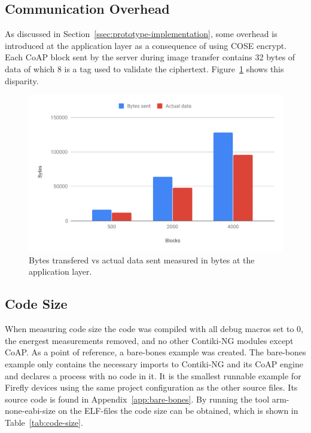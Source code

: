 \documentclass[0-thesis.tex]{subfiles}
\begin{document}
\newpage
\subsection{Communication Overhead}
\label{ssec:communication-overhead}
As discussed in Section~\ref{ssec:prototype-implementation}, some overhead is introduced
at the application layer as a consequence of using COSE encrypt. Each CoAP block sent by
the server during image transfer contains 32 bytes of data of which 8 is a tag used to
validate the ciphertext. Figure~\ref{fig:communication-overhead} shows this disparity.

\begin{figure}[h!]
    \caption{Bytes transfered vs actual data sent measured in bytes at the application layer.}
    \label{fig:communication-overhead}
    \includegraphics[scale=0.65]{images/communication-overhead.pdf}
\end{figure}

\subsection{Code Size}
\label{ssec:code-size}
When measuring code size the code was compiled with all debug macros set to 0, the
energest measurements removed, and no other Contiki-NG modules except CoAP. As a point of
reference, a bare-bones example was created. The bare-bones example only contains the
necessary imports to Contiki-NG and its CoAP engine and declares a process with no code in
it. It is the smallest runnable example for Firefly devices using the same project
configuration as the other source files. Its source code is found in
Appendix~\ref{app:bare-bones}. By running the tool arm-none-eabi-size on the ELF-files the
code size can be obtained, which is shown in Table~\ref{tab:code-size}.
\end{document}

